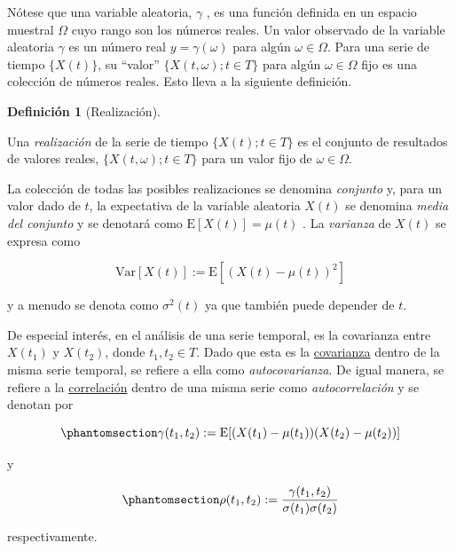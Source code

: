 \documentclass[
  us-letterpaper,
]{scrreprt}
\theoremstyle{plain}
\theoremstyle{definition}
\newtheorem{definition}{Definición}[chapter]
\theoremstyle{definition}
\theoremstyle{plain}
\theoremstyle{remark}
\begin{document}
Nótese que una variable aleatoria, \(\gamma\) , es una función definida
en un espacio muestral \(\Omega\) cuyo rango son los números reales. Un
valor observado de la variable aleatoria \(\gamma\) es un número real
\(y=\gamma(\omega)\) para algún \(\omega\in\Omega\). Para una serie de
tiempo \(\{X(t)\}\), su ``valor'' \(\{X(t,\omega);t\in T\}\) para algún
\(\omega\in\Omega\) fijo es una colección de números reales. Esto lleva
a la siguiente definición.

\begin{definition}[Realización]\protect\hypertarget{def-realizacion}{}\label{def-realizacion}

Una \emph{realización} de la serie de tiempo \(\{X(t);t\in T\}\) es el
conjunto de resultados de valores reales, \(\{X(t,\omega);t\in T\}\)
para un valor fijo de \(\omega \in \Omega\).

\end{definition}

La colección de todas las posibles realizaciones se denomina
\emph{conjunto} y, para un valor dado de \(t\), la expectativa de la
variable aleatoria \(X(t)\) se denomina \emph{media del conjunto} y se
denotará como \(\mathrm E[X(t)]=\mu(t)\) . La \emph{varianza} de
\(X(t)\) se expresa como

\[
\mathrm{Var}[X(t)]:=\mathrm{E}[(X(t)-\mu(t))^2]
\]

y a menudo se denota como \(\sigma^2(t)\) ya que también puede depender
de \(t\).

\label{.remark}
De especial interés, en el análisis de una serie temporal, es la
covarianza entre \(X(t_1)\) y \(X(t_2)\), donde \(t_1, t_2\in T\). Dado
que esta es la \hyperref[def-cov]{covarianza} dentro de la misma serie
temporal, se refiere a ella como \emph{autocovarianza}. De igual manera,
se refiere a la \hyperref[def-corr]{correlación} dentro de una misma
serie como \emph{autocorrelación} y se denotan por

\begin{equation}\phantomsection\label{eq-autocov}{
\gamma(t_1,t_2):=\mathrm{E}[(X(t_1)-\mu(t_1))(X(t_2)-\mu(t_2))]
}\end{equation}

y

\begin{equation}\phantomsection\label{eq-autocorr}{
\rho(t_1,t_2):= \frac{\gamma(t_1,t_2)}{\sigma(t_1)\sigma(t_2)} 
}\end{equation}

respectivamente.
\end{document}
